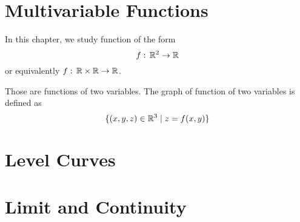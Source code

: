 \section{Multivariable Functions}

In this chapter, we study function of the form
$$
f:\, {\mathbb R}^2 \to {\mathbb R}
$$
or equivalently $f:\, {\mathbb R}\times{\mathbb R} \to {\mathbb R}$.

Those are functions of two variables. The graph of function of two variables is defined as
$$
\{ (x,y,z) \in {\mathbb R}^3 \mid z = f(x,y) \}
$$

\section{Level Curves}

\section{Limit and Continuity}

